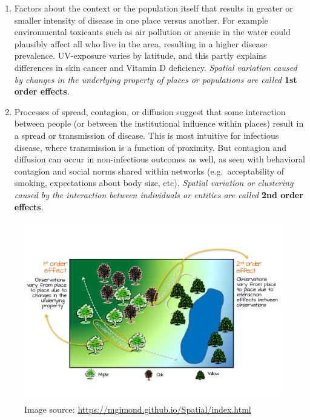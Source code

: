 \documentclass[
]{book}
\providecommand{\tightlist}{%
  \setlength{\itemsep}{0pt}\setlength{\parskip}{0pt}}
\begin{document}
\begin{enumerate}
\def\labelenumi{\arabic{enumi}.}
\tightlist
\item
  Factors about the context or the population itself that results in greater or smaller intensity of disease in one place versus another. For example environmental toxicants such as air pollution or arsenic in the water could plausibly affect all who live in the area, resulting in a higher disease prevalence. UV-exposure varies by latitude, and this partly explains differences in skin cancer and Vitamin D deficiency. \emph{Spatial variation caused by changes in the underlying property of places or populations are called} \textbf{1st order effects}.
\item
  Processes of spread, contagion, or diffusion suggest that some interaction between people (or between the institutional influence within places) result in a spread or transmission of disease. This is most intuitive for infectious disease, where transmission is a function of proximity. But contagion and diffusion can occur in non-infectious outcomes as well, as seen with behavioral contagion and social norms shared within networks (e.g.~acceptability of smoking, expectations about body size, etc). \emph{Spatial variation or clustering caused by the interaction between individuals or entities are called} \textbf{2nd order effects}.
\end{enumerate}

\begin{figure}
\centering
\includegraphics{images/1st_2nd_order_property.png}
\caption{\label{fig:unnamed-chunk-3}Image source: \url{https://mgimond.github.io/Spatial/index.html}}
\end{figure}
\end{document}
